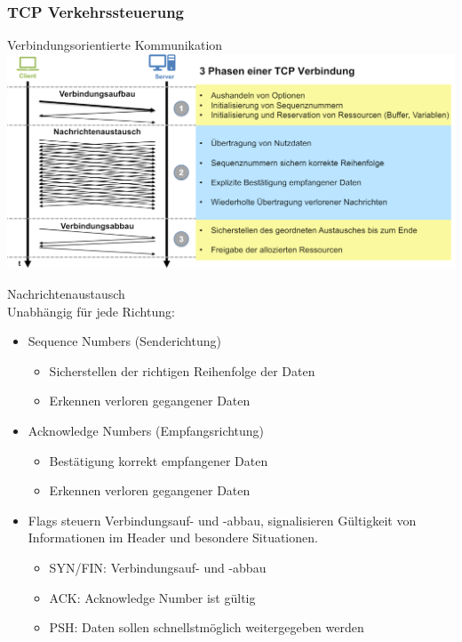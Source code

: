 \subsubsection{TCP Verkehrssteuerung}

\begin{concept}{Verbindungsorientierte Kommunikation}\\
    \includegraphics[width=1\linewidth]{images/verbindungsorientierte_kommunikation.png}
\end{concept}

\begin{concept}{Nachrichtenaustausch}\\
    Unabhängig für jede Richtung:
    \begin{itemize}
        \item Sequence Numbers (Senderichtung)
        \begin{itemize}
            \item Sicherstellen der richtigen Reihenfolge der Daten
            \item Erkennen verloren gegangener Daten
        \end{itemize}
        \item Acknowledge Numbers (Empfangsrichtung)
        \begin{itemize}
            \item Bestätigung korrekt empfangener Daten
            \item Erkennen verloren gegangener Daten
        \end{itemize}
        \item Flags steuern Verbindungsauf- und -abbau, signalisieren Gültigkeit von Informationen im Header und besondere Situationen.
        \begin{itemize}
            \item SYN/FIN: Verbindungsauf- und -abbau
            \item ACK: Acknowledge Number ist gültig
            \item PSH: Daten sollen schnellstmöglich weitergegeben werden
        \end{itemize}
    \end{itemize}
\end{concept}

